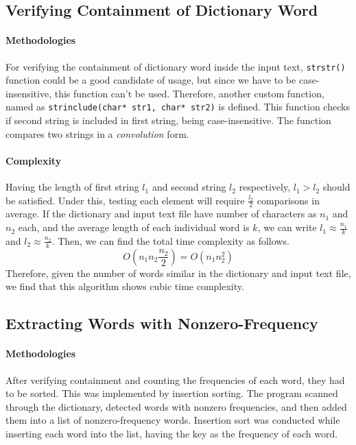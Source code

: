 \documentclass[11pt]{article}
\begin{document}
	\subsection{Verifying Containment of Dictionary Word}
	\paragraph{Methodologies}
	For verifying the containment of dictionary word inside the input text, \texttt{strstr()} function could be a good candidate of usage, but since we have to be case-insensitive, this function can't be used. Therefore, another custom function, named as \texttt{strinclude(char* str1, char* str2)} is defined. This function checks if second string is included in first string, being case-insensitive. The function compares two strings in a \textit{convolution} form.
	
	\paragraph{Complexity}
	Having the length of first string $ l_1 $ and second string $ l_2 $ respectively, $ l_1 > l_2 $ should be satisfied. Under this, testing each element will require $ \frac{l_2}{2} $ comparisons in average. If the dictionary and input text file have number of characters as $ n_1 $ and $ n_2 $ each, and the average length of each individual word is $ k $, we can write $ l_1 \approx \frac{n_1}{k} $ and $ l_2 \approx \frac{n_2}{k} $. Then, we can find the total time complexity as follows.
	\begin{equation}
		O(n_1 n_2 \frac{n_2}{2}) = O(n_1 n_2^2)
	\end{equation}
	Therefore, given the number of words similar in the dictionary and input text file, we find that this algorithm shows cubic time complexity.
	
	\subsection{Extracting Words with Nonzero-Frequency}
	\paragraph{Methodologies}
	After verifying containment and counting the frequencies of each word, they had to be sorted. This was implemented by insertion sorting. The program scanned through the dictionary, detected words with nonzero frequencies, and then added them into a list of nonzero-frequency words. Insertion sort was conducted while inserting each word into the list, having the key as the frequency of each word.
	
\end{document}
